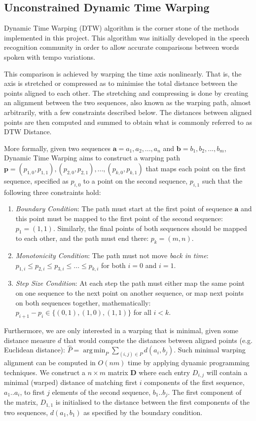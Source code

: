 \documentclass[parskip]{cs4rep}
\DeclareMathOperator*{\argmin}{arg\,min}
\begin{document}
\subsection{Unconstrained Dynamic Time Warping}

Dynamic Time Warping (DTW) algorithm is the corner stone of the methods implemented in this project. This algorithm was initially developed in the speech recognition community in order to allow accurate comparisons between words spoken with tempo variations. 

This comparison is achieved by warping the time axis nonlinearly. That is, the axis is stretched or compressed as to minimise the total distance between the points aligned to each other. The stretching and compressing is done by creating an alignment between the two sequences, also known as the warping path, almost arbitrarily, with a few constraints described below. The distances between aligned points are then computed and summed to obtain what is commonly referred to as DTW Distance.

More formally, given two sequences $\mathbf{a} = a_1, a_2, ..., a_n$ and $\mathbf{b} = b_1, b_2, ..., b_m$, Dynamic Time Warping aims to construct a warping path $\mathbf{p} = { (p_{1,0}, p_{1,1}), (p_{2,0}, p_{2,1}), ..., (p_{k,0}, p_{k, 1}) }$ that maps each point on the first sequence, specified as $p_{i,0}$ to a point on the second sequence, $p_{i,1}$ such that the following three constraints hold:

\begin{enumerate}
\item \emph{Boundary Condition}: The path must start at the first point of sequence $\mathbf{a}$ and this point must be mapped to the first point of the second sequence: $p_1 = (1,1)$. Similarly, the final points of both sequences should be mapped to each other, and the path must end there: $p_k = (m, n).$ 
\item \emph{Monotonicity Condition}: The path must not move \emph{back in time}: 
    $p_{1,i} \le p_{2,i} \le p_{3,i} \le ... \le p_{k, i}$ for both $i=0$ and $i=1$.
\item \emph{Step Size Condition}: At each step the path must either map the same point on one sequence to the next point on another sequence, or map next points on both sequences together, mathematically:
    $p_{i+1} - p_{i} \in \{(0,1), (1,0), (1,1)\}$ for all $i < k$.
\end{enumerate}

Furthermore, we are only interested in a warping that is minimal, given some distance measure $d$ that would compute the distances between aligned points (e.g. Euclidean distance): $\hat{P} = \argmin_P \sum_{(i,j) \in P} d(a_i, b_j)$. Such minimal warping alignment can be computed in $O(nm)$ time by applying dynamic programming techniques. We construct a $n \times m$ matrix $\mathbf{D}$ where each entry $D_{i,j}$ will contain a minimal (warped) distance of matching first $i$ components of the first sequence, $a_1..a_i$, to first $j$ elements of the second sequence, $b_1..b_j$. The first component of the matrix, $D_{1,1}$ is initialised to the distance between the first components of the two sequences, $d(a_1, b_1)$ as specified by the boundary condition.
\end{document}
